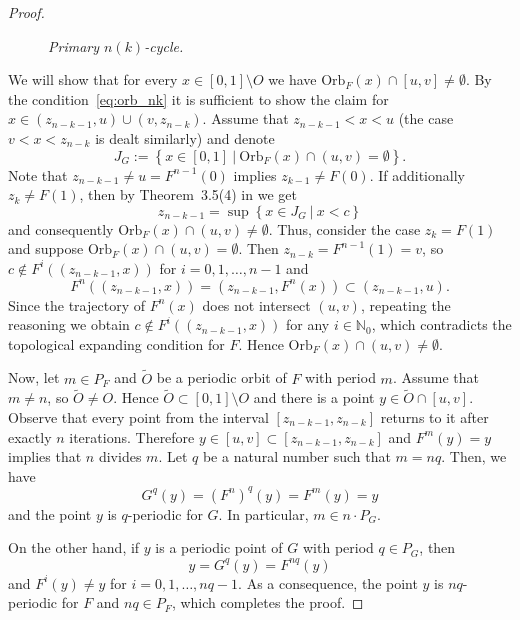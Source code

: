 \documentclass[10pt,reqno]{amsart}
\theoremstyle{plain}
\theoremstyle{assumption}
\theoremstyle{notation}
\theoremstyle{claim}
\theoremstyle{conj}
\theoremstyle{theorem}
\theoremstyle{proposition}
\theoremstyle{corollary}
\begin{document}
\begin{proof}
\begin{figure}[h]
		\caption{\textit{Primary $n(k)$-cycle.}}
		\label{fig:nk_cycle}
	\end{figure}

We will show that for every $x\in[0,1]\setminus O$ we have $\text{Orb}_{F}(x)\cap[u,v]\neq\emptyset$. By the condition~\eqref{eq:orb_nk} it is sufficient to show the claim for $x\in(z_{n-k-1},u)\cup(v,z_{n-k})$. Assume that $z_{n-k-1}<x<u$ (the case $v<x<z_{n-k}$ is dealt similarly) and denote
$$
J_G:=\left\lbrace x\in [0,1]\:|\: \text{Orb}_F(x)\cap \left(u, v\right) =\emptyset\right\rbrace .
$$
Note that $z_{n-k-1}\neq u=F^{n-1}(0)$ implies $z_{k-1}\neq F(0)$. If additionally $z_k\neq F(1)$, then by Theorem~3.5(4) in \cite{ChO} we get
$$
z_{n-k-1} =\sup\left\lbrace x\in J_G \:|\: x<c\right\rbrace
$$
and consequently $\text{Orb}_F(x)\cap(u,v)\neq\emptyset$. Thus, consider the case $z_k=F(1)$ and suppose $\text{Orb}_F(x)\cap(u,v)=\emptyset$. Then $z_{n-k}=F^{n-1}(1)=v$, so $c\notin F^i((z_{n-k-1},x))$ for $i=0,1,\ldots,n-1$ and
$$
F^n((z_{n-k-1},x))=(z_{n-k-1},F^n(x))\subset(z_{n-k-1},u).
$$
Since the trajectory of $F^n(x)$ does not intersect $(u,v)$, repeating the reasoning we obtain $c\notin F^i((z_{n-k-1},x))$ for any $i\in\mathbb{N}_0$, which contradicts the topological expanding condition for $F$. Hence $\text{Orb}_{F}(x)\cap(u,v)\neq\emptyset$.

Now, let $m\in P_F$ and $\widetilde{O}$ be a periodic orbit of $F$ with period $m$. Assume that $m\neq n$, so $\widetilde{O}\neq O$. Hence $\widetilde{O}\subset[0,1]\setminus O$ and there is a point $y\in\widetilde{O}\cap[u,v]$. Observe that every point from the interval $[z_{n-k-1},z_{n-k}]$ returns to it after exactly $n$ iterations. Therefore $y\in[u,v]\subset[z_{n-k-1},z_{n-k}]$ and $F^m(y)=y$ implies that $n$ divides $m$. Let $q$ be a natural number such that $m=nq$. Then, we have
$$
G^q(y)=(F^n)^q(y)=F^m(y)=y
$$
and the point $y$ is $q$-periodic for $G$. In particular, $m\in n\cdot P_G$.

On the other hand, if $y$ is a periodic point of $G$ with period $q\in P_G$, then
$$
y=G^q(y)=F^{n q}(y)
$$
and $F^i(y)\neq y$ for $i=0,1,\ldots, n q-1$. As a consequence, the point $y$ is $nq$-periodic for $F$ and $nq\in P_F$, which completes the proof.
\end{proof}
\end{document}
